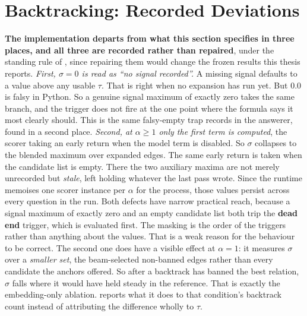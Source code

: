 \section{Backtracking: Recorded Deviations}\label{app:backtrack-deviations}

\textbf{The implementation departs from what this section specifies in three
places, and all three are recorded rather than repaired}, under the standing
rule of , since repairing them would change the
frozen results this thesis reports. \emph{First, $\sigma = 0$ is read as ``no
signal recorded''.} A missing signal defaults to a value above any usable
$\tau$. That is right when no expansion has run yet. But $0.0$ is falsy in
Python. So a genuine signal maximum of exactly zero takes the same branch, and
the trigger does not fire at the one point where the formula says it most
clearly should. This is the same falsy-empty trap 
records in the answerer, found in a second place. \emph{Second, at $\alpha \geq
1$ only the first term is computed}, the scorer taking an early return when the
model term is disabled. So $\sigma$ collapses to the blended maximum over
expanded edges. The same early return is taken when the candidate list is empty.
There the two auxiliary maxima are not merely unrecorded but \emph{stale},
left holding whatever the last pass wrote. Since the runtime memoises one
scorer instance per $\alpha$ for the process, those values persist across every
question in the run. Both defects have narrow practical reach, because a signal
maximum of exactly zero and an empty candidate list both trip the \textbf{dead
end} trigger, which is evaluated first. The masking is the order of the
triggers rather than anything about the values. That is a weak reason for the
behaviour to be correct. The second one does have a visible effect at $\alpha =
1$: it measures $\sigma$ over a \emph{smaller set}, the beam-selected
non-banned edges rather than every candidate the anchors offered. So after a
backtrack has banned the best relation, $\sigma$ falls where it would have held
steady in the reference. That is exactly the embedding-only ablation.
 reports what it does to that condition's backtrack count
instead of attributing the difference wholly to $\tau$.

